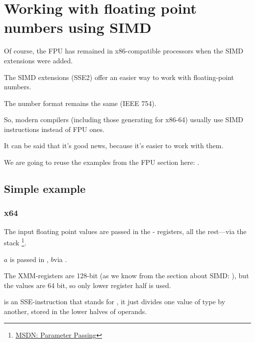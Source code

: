 \section{Working with floating point numbers using SIMD}

\label{floating_SIMD}

Of course, the \ac{FPU} has remained in x86-compatible processors when the \ac{SIMD} extensions were added.

The \ac{SIMD} extensions (SSE2) offer an easier way to work with floating-point numbers.

The number format remains the same (IEEE 754).

So, modern compilers (including those generating
for x86-64) usually use \ac{SIMD} instructions instead of FPU ones.

It can be said that it's good news, because it's easier to work with them.

We are going to reuse the examples from the FPU section here: .

\subsection{Simple example}



\subsubsection{x64}



The input floating point values are passed in the - registers,
all the rest---via the stack
\footnote{\href{http://go.yurichev.com/17263}{MSDN: Parameter Passing}}.

$a$ is passed in , $b$\EMDASH{}via .

The XMM-registers are 128-bit (as we know from the section about \ac{SIMD}: ), 
but the \Tdouble values are 64 bit, so only lower register half is used.

 is an SSE-instruction that stands for 
, 
it just divides
one value of type \Tdouble by another, stored in the lower halves of operands.

